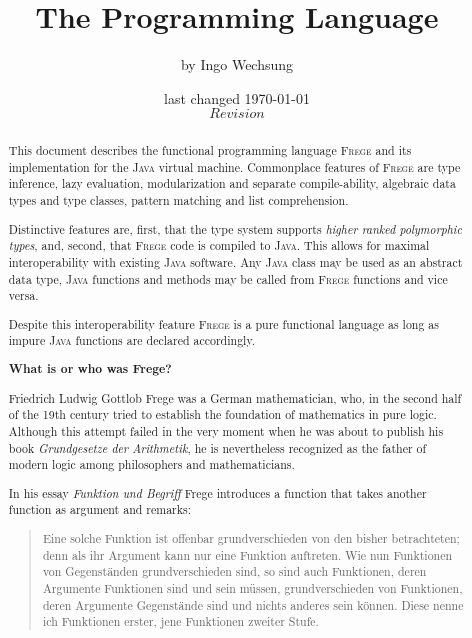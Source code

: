 \documentclass[lletterpaper,12pt]{report}
\date{last changed \today{} \\ $Revision$}
\author{\small{by Ingo Wechsung}}
\title{The \frege{} Programming Language}
\newcommand{\inmargin}[1]{\marginpar{\scriptsize\raggedright #1}}
\newcommand{\frege}[0]{\textsc{Frege}}
\newcommand{\java}[0]{\textsc{Java}}
\begin{document}
\maketitle



\begin{abstract}

This document describes the functional programming language \frege{}
and its implementation
for the \java{} virtual machine. Commonplace features of \frege{} are
type inference,
lazy evaluation,
modularization and separate compile-ability,
algebraic data types and type classes,
pattern matching and list comprehension.

Distinctive features are, first, that the type system supports
\emph{higher ranked polymorphic types},
and, second,
that \frege{} code is compiled to \java{}.
This allows for maximal interoperability with existing
\java{} software.
Any \java{} class may be used as an abstract data type, \java{}
functions and methods may be called from \frege{} functions and vice
versa.

Despite this interoperability feature  \frege{} is a pure functional language as long as impure \java{} functions are declared accordingly.

\begin{center}\textbf{What is or who was Frege?}\end{center}

Friedrich Ludwig Gottlob Frege
was a
German mathematician, who, in the second half of the 19th
century tried to establish the foundation of mathematics in pure
logic. Although this attempt failed in the very moment when he
was about to publish his book \emph{Grundgesetze der Arithmetik},
he is nevertheless recognized as the father of modern logic among
philosophers and mathematicians.

In his essay \emph{Funktion und Begriff} \cite{f1891} Frege introduces a function that takes another function as argument and remarks:

\begin{quote}
\small{
Eine solche Funktion ist offenbar grundverschieden von den bisher betrachteten; denn als ihr Argument kann nur eine Funktion auftreten. Wie nun Funktionen von Gegenständen grundverschieden sind, so sind auch Funktionen, deren Argumente Funktionen sind und sein müssen, grundverschieden von Funktionen, deren Argumente Gegenstände sind und nichts anderes sein können. Diese nenne ich Funktionen erster, jene Funktionen zweiter Stufe.
}
\end{quote}


\end{abstract}
\end{document}
